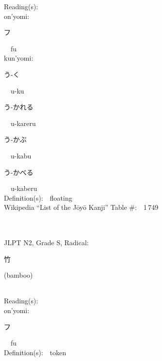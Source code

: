 \begin{multicols}{2}
Reading(s):\ \ \\
{\hspace*{1em}}on'yomi:\ \ \\
{\hspace*{2em}}{\begin{CJK}{UTF8}{min} フ \end{CJK}}\ \ fu\ \ \\
{\hspace*{1em}}kun'yomi:\ \ \\
{\hspace*{2em}}{\begin{CJK}{UTF8}{min} う-く \end{CJK}}\ \ u-ku\ \ \\
{\hspace*{2em}}{\begin{CJK}{UTF8}{min} う-かれる \end{CJK}}\ \ u-kareru\ \ \\
{\hspace*{2em}}{\begin{CJK}{UTF8}{min} う-かぶ \end{CJK}}\ \ u-kabu\ \ \\
{\hspace*{2em}}{\begin{CJK}{UTF8}{min} う-かべる \end{CJK}}\ \ u-kaberu\ \ \\
Definition(s):\ \ floating \\
Wikipedia ``List of the J\=oy\=o Kanji'' Table \#:\ \ 1\,749 \\
\ \ \\
{\fontsize{34pt}{40pt}  }\ \ \\  %
{JLPT N2, Grade S, Radical:\ \ {\begin{CJK}{UTF8}{min} 竹 \end{CJK}} (bamboo) } \\
Reading(s):\ \ \\
{\hspace*{1em}}on'yomi:\ \ \\
{\hspace*{2em}}{\begin{CJK}{UTF8}{min} フ \end{CJK}}\ \ fu\ \ \\
Definition(s):\ \ token \\

\end{multicols}
